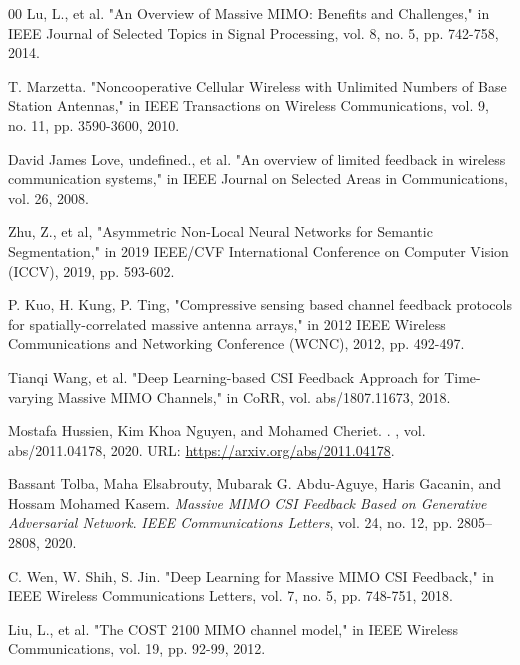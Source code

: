 \documentclass[lettersize,journal]{IEEEtran}
\begin{document}
\begin{thebibliography}{00}
    Lu, L., et al. "An Overview of Massive MIMO: Benefits and Challenges," in IEEE Journal of Selected Topics in Signal Processing, vol. 8, no. 5, pp. 742-758, 2014.

    T. Marzetta. "Noncooperative Cellular Wireless with Unlimited Numbers of Base Station Antennas," in IEEE Transactions on Wireless Communications, vol. 9, no. 11, pp. 3590-3600, 2010.

    David James Love, undefined., et al. "An overview of limited feedback in wireless communication systems," in IEEE Journal on Selected Areas in Communications, vol. 26, 2008.

    Zhu, Z., et al, "Asymmetric Non-Local Neural Networks for Semantic Segmentation," in 2019 IEEE/CVF International Conference on Computer Vision (ICCV), 2019, pp. 593-602.

    P. Kuo, H. Kung, P. Ting, "Compressive sensing based channel feedback protocols for spatially-correlated massive antenna arrays," in 2012 IEEE Wireless Communications and Networking Conference (WCNC), 2012, pp. 492-497.
    
    Tianqi Wang, et al. "Deep Learning-based CSI Feedback Approach for Time-varying Massive MIMO Channels," in CoRR, vol. abs/1807.11673, 2018.
    
    
   	Mostafa Hussien, Kim Khoa Nguyen, and Mohamed Cheriet.
    .
    , vol. abs/2011.04178, 2020.
    \newblock URL: \url{https://arxiv.org/abs/2011.04178}.
    
    
    Bassant Tolba, Maha Elsabrouty, Mubarak G. Abdu-Aguye, Haris Gacanin, and Hossam Mohamed Kasem.
    \newblock \emph{Massive MIMO CSI Feedback Based on Generative Adversarial Network}.
    \newblock \emph{IEEE Communications Letters}, vol. 24, no. 12, pp. 2805–2808, 2020.
    

    C. Wen, W. Shih, S. Jin. "Deep Learning for Massive MIMO CSI Feedback," in IEEE Wireless Communications Letters, vol. 7, no. 5, pp. 748-751, 2018.

    Liu, L., et al. "The COST 2100 MIMO channel model," in IEEE Wireless Communications, vol. 19, pp. 92-99, 2012.


\end{thebibliography}
\end{document}

